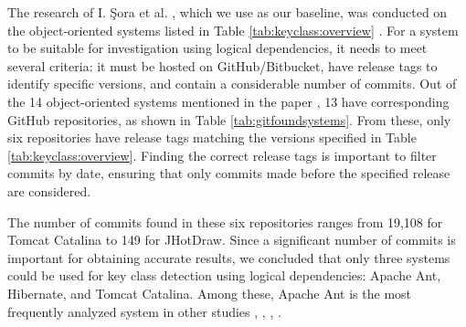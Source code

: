 \hspace{4em}The research of I. Şora et al. \cite{Finding-key-classes}, which we use as our baseline, was conducted on the object-oriented systems listed in Table \ref{tab:keyclass:overview} \cite{b4}. For a system to be suitable for investigation using logical dependencies, it needs to meet several criteria: it must be hosted on GitHub/Bitbucket, have release tags to identify specific versions, and contain a considerable number of commits. Out of the 14 object-oriented systems mentioned in the paper \cite{Finding-key-classes}, 13 have corresponding GitHub repositories, as shown in Table \ref{tab:gitfoundsystems}. From these, only six repositories have release tags matching the versions specified in Table \ref{tab:keyclass:overview}. Finding the correct release tags is important to filter commits by date, ensuring that only commits made before the specified release are considered.

The number of commits found in these six repositories ranges from 19,108 for Tomcat Catalina to 149 for JHotDraw. Since a significant number of commits is important for obtaining accurate results, we concluded that only three systems could be used for key class detection using logical dependencies: Apache Ant, Hibernate, and Tomcat Catalina. Among these, Apache Ant is the most frequently analyzed system in other studies \cite{enase19}, \cite{7332515}, \cite{1402122}, \cite{Kamran2016IdentificationOC}.

